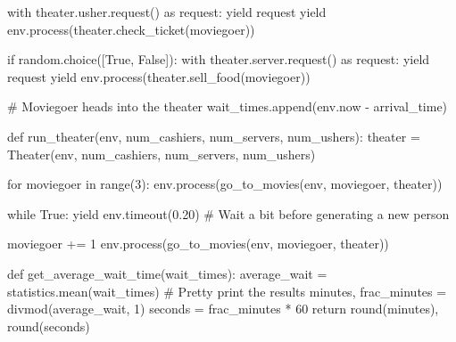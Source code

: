 \documentclass[
  11pt,
]{article}
\newenvironment{Shaded}{\begin{snugshade}}{\end{snugshade}}
\newcommand{\BuiltInTok}[1]{\textcolor[rgb]{0.00,0.23,0.31}{#1}}
\newcommand{\CommentTok}[1]{\textcolor[rgb]{0.37,0.37,0.37}{#1}}
\newcommand{\ControlFlowTok}[1]{\textcolor[rgb]{0.00,0.23,0.31}{#1}}
\newcommand{\DecValTok}[1]{\textcolor[rgb]{0.68,0.00,0.00}{#1}}
\newcommand{\FloatTok}[1]{\textcolor[rgb]{0.68,0.00,0.00}{#1}}
\newcommand{\ImportTok}[1]{\textcolor[rgb]{0.00,0.46,0.62}{#1}}
\newcommand{\KeywordTok}[1]{\textcolor[rgb]{0.00,0.23,0.31}{#1}}
\newcommand{\NormalTok}[1]{\textcolor[rgb]{0.00,0.23,0.31}{#1}}
\newcommand{\OperatorTok}[1]{\textcolor[rgb]{0.37,0.37,0.37}{#1}}
\newcommand{\VariableTok}[1]{\textcolor[rgb]{0.07,0.07,0.07}{#1}}
\begin{document}
\begin{Shaded}
\begin{Highlighting}[]
    \ControlFlowTok{with}\NormalTok{ theater.usher.request() }\ImportTok{as}\NormalTok{ request:}
        \ControlFlowTok{yield}\NormalTok{ request}
        \ControlFlowTok{yield}\NormalTok{ env.process(theater.check\_ticket(moviegoer))}

    \ControlFlowTok{if}\NormalTok{ random.choice([}\VariableTok{True}\NormalTok{, }\VariableTok{False}\NormalTok{]):}
        \ControlFlowTok{with}\NormalTok{ theater.server.request() }\ImportTok{as}\NormalTok{ request:}
            \ControlFlowTok{yield}\NormalTok{ request}
            \ControlFlowTok{yield}\NormalTok{ env.process(theater.sell\_food(moviegoer))}

    \CommentTok{\# Moviegoer heads into the theater}
\NormalTok{    wait\_times.append(env.now }\OperatorTok{{-}}\NormalTok{ arrival\_time)}


\KeywordTok{def}\NormalTok{ run\_theater(env, num\_cashiers, num\_servers, num\_ushers):}
\NormalTok{    theater }\OperatorTok{=}\NormalTok{ Theater(env, num\_cashiers, num\_servers, num\_ushers)}

    \ControlFlowTok{for}\NormalTok{ moviegoer }\KeywordTok{in} \BuiltInTok{range}\NormalTok{(}\DecValTok{3}\NormalTok{):}
\NormalTok{        env.process(go\_to\_movies(env, moviegoer, theater))}

    \ControlFlowTok{while} \VariableTok{True}\NormalTok{:}
        \ControlFlowTok{yield}\NormalTok{ env.timeout(}\FloatTok{0.20}\NormalTok{)  }\CommentTok{\# Wait a bit before generating a new person}

\NormalTok{        moviegoer }\OperatorTok{+=} \DecValTok{1}
\NormalTok{        env.process(go\_to\_movies(env, moviegoer, theater))}


\KeywordTok{def}\NormalTok{ get\_average\_wait\_time(wait\_times):}
\NormalTok{    average\_wait }\OperatorTok{=}\NormalTok{ statistics.mean(wait\_times)}
    \CommentTok{\# Pretty print the results}
\NormalTok{    minutes, frac\_minutes }\OperatorTok{=} \BuiltInTok{divmod}\NormalTok{(average\_wait, }\DecValTok{1}\NormalTok{)}
\NormalTok{    seconds }\OperatorTok{=}\NormalTok{ frac\_minutes }\OperatorTok{*} \DecValTok{60}
    \ControlFlowTok{return} \BuiltInTok{round}\NormalTok{(minutes), }\BuiltInTok{round}\NormalTok{(seconds)}



\end{Highlighting}
\end{Shaded}
\end{document}
